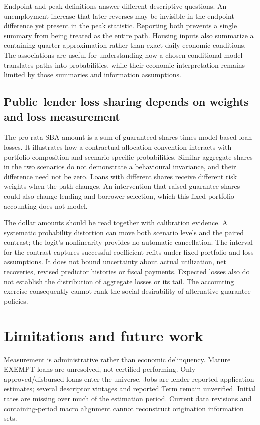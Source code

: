 Endpoint and peak definitions answer different descriptive questions. An unemployment increase that later reverses may be invisible in the endpoint difference yet present in the peak statistic. Reporting both prevents a single summary from being treated as the entire path. Housing inputs also summarize a containing-quarter approximation rather than exact daily economic conditions. The associations are useful for understanding how a chosen conditional model translates paths into probabilities, while their economic interpretation remains limited by those summaries and information assumptions.

\subsection{Public--lender loss sharing depends on weights and loss measurement}
The pro-rata SBA amount is a sum of guaranteed shares times model-based loan losses. It illustrates how a contractual allocation convention interacts with portfolio composition and scenario-specific probabilities. Similar aggregate shares in the two scenarios do not demonstrate a behavioural invariance, and their difference need not be zero. Loans with different shares receive different risk weights when the path changes. An intervention that raised guarantee shares could also change lending and borrower selection, which this fixed-portfolio accounting does not model.

The dollar amounts should be read together with calibration evidence. A systematic probability distortion can move both scenario levels and the paired contrast; the logit's nonlinearity provides no automatic cancellation. The interval for the contrast captures successful coefficient refits under fixed portfolio and loss assumptions. It does not bound uncertainty about actual utilization, net recoveries, revised predictor histories or fiscal payments. Expected losses also do not establish the distribution of aggregate losses or its tail. The accounting exercise consequently cannot rank the social desirability of alternative guarantee policies.

\section{Limitations and future work}
Measurement is administrative rather than economic delinquency. Mature EXEMPT loans are unresolved, not certified performing. Only approved/disbursed loans enter the universe. Jobs are lender-reported application estimates; several descriptor vintages and reported Term remain unverified. Initial rates are missing over much of the estimation period. Current data revisions and containing-period macro alignment cannot reconstruct origination information sets.

